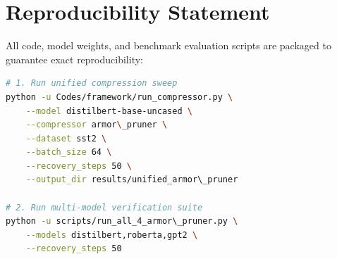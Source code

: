 \section{Reproducibility Statement}
All code, model weights, and benchmark evaluation scripts are packaged to guarantee exact reproducibility:
\begin{lstlisting}[language=bash]
# 1. Run unified compression sweep
python -u Codes/framework/run_compressor.py \
    --model distilbert-base-uncased \
    --compressor armor\_pruner \
    --dataset sst2 \
    --batch_size 64 \
    --recovery_steps 50 \
    --output_dir results/unified_armor\_pruner

# 2. Run multi-model verification suite
python -u scripts/run_all_4_armor\_pruner.py \
    --models distilbert,roberta,gpt2 \
    --recovery_steps 50
\end{lstlisting}
